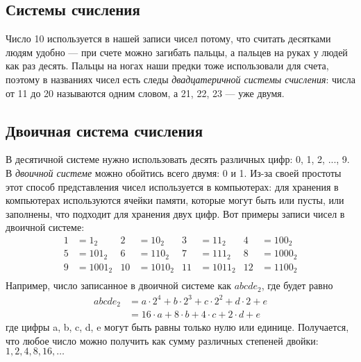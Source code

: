 \documentclass[a4paper,12pt]{article}
\begin{document}
    \subsection{Системы счисления}
    Число 10 используется в нашей записи чисел потому, что считать десятками людям
    удобно --- при счете можно загибать пальцы, а пальцев на руках у людей 
    как раз десять. Пальцы на ногах наши предки тоже использовали для счета, поэтому в названиях
    чисел есть следы \emph{двадцатеричной системы счисления}: числа от 11 до 20 называются
    одним словом, а 21, 22, 23 --- уже двумя.

    \subsection{Двоичная система счисления}
    В десятичной системе нужно использовать десять различных цифр: 0, 1, 2, ..., 9.
    В \emph{двоичной системе} можно обойтись всего двумя: 0 и 1. Из-за своей простоты
    этот способ представления чисел используется в компьютерах: для хранения в 
    компьютерах используются ячейки памяти, которые могут быть или пусты, или 
    заполнены, что подходит для хранения двух цифр. Вот примеры записи чисел в 
    двоичной системе:
    \begin{align*}
        1 &= 1_2  &  2 &= 10_2  &  3 &= 11_2  &  4 &= 100_2 \\
        5 &= 101_2  &  6 &=  110_2 & 7 &= 111_2  &  8 &= 1000_2\\
        9 &= 1001_2  &  10 &= 1010_2  &  11 &= 1011_2  &  12 &= 1100_2\\    
    \end{align*}
    Например, число записанное в двоичной системе как $abcde_2$, где
    будет равно
    \begin{align*}
        abcde_2 &= a\cdot 2^4 + b\cdot 2^3 + c\cdot 2^2 + d\cdot 2 + e\\
                &= 16\cdot a + 8\cdot b + 4\cdot c + 2\cdot d + e
    \end{align*}
    где цифры a, b, c, d, e могут быть равны только нулю или единице.
    Получается, что любое число можно получить как сумму различных
    степеней двойки: $1, 2, 4, 8, 16, \ldots$ 
    
    
\end{document}

